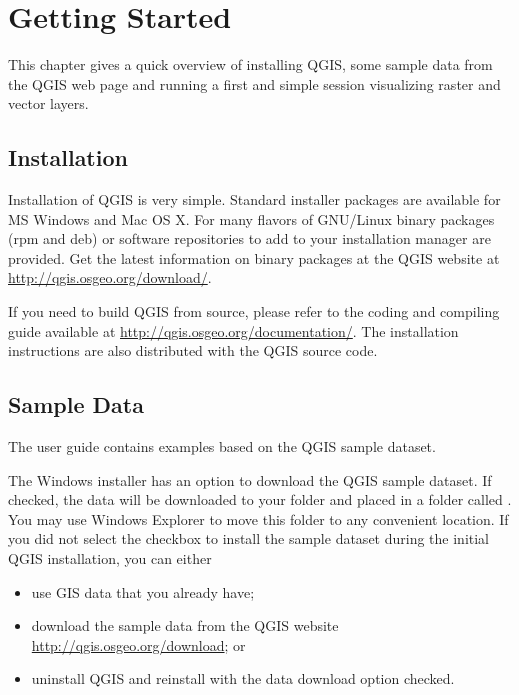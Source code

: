 
\section{Getting Started}\label{label_getstarted}


This chapter gives a quick overview of installing QGIS, some sample 
data from the QGIS web page and running a first and simple session 
visualizing raster and vector layers.

\subsection{Installation}\label{label_installation}

Installation of QGIS is very simple. Standard installer packages are
available for MS Windows and Mac OS X. For many flavors of GNU/Linux binary
packages (rpm and deb) or software repositories to add to your installation
manager are provided. Get the latest information on binary packages at the
QGIS website at \url{http://qgis.osgeo.org/download/}.


If you need to build QGIS from source, please refer to the coding and
compiling guide available at \url{http://qgis.osgeo.org/documentation/}. 
The installation instructions are also distributed with the QGIS source
code.

\subsection{Sample Data}\label{label_sampledata}

The user guide contains examples based on the QGIS sample dataset. 

\win The Windows installer has an option to download the QGIS sample dataset.
If checked, the data will be downloaded to your 
folder and placed in a folder called . 
You may use Windows Explorer to move this folder to any convenient location.
If you did not select the checkbox to install the sample dataset
during the initial QGIS installation, you can either
\begin{itemize}
\item use GIS data that you already have;
\item download the sample data from the QGIS website
 \url{http://qgis.osgeo.org/download}; or
\item uninstall QGIS and reinstall with the data download option checked.
\end{itemize}

